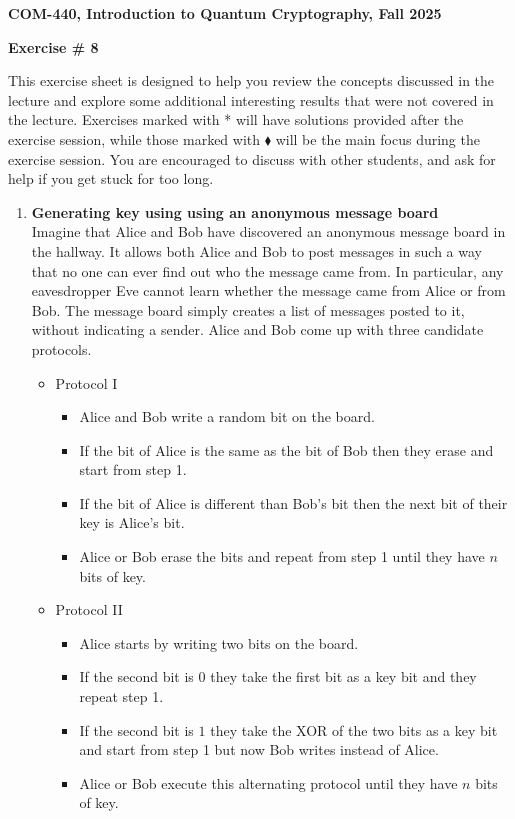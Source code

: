 \documentclass[12pt]{article}
\newcommand{\header}[1]{\begin{center} {\large\bf #1} \end{center}}
\begin{document}
\header{COM-440, Introduction to Quantum Cryptography, Fall 2025}
\header{\bf Exercise \# 8}

This exercise sheet is designed to help you review the concepts discussed in the lecture and explore some additional interesting results that were not covered in the lecture. Exercises marked with * will have solutions provided after the exercise session, while those marked with $\blacklozenge$ will be the main focus during the exercise session. You are encouraged to discuss with other students, and ask for help if you get stuck for too long.

\begin{enumerate}


\item {\bf Generating key using using an anonymous message board}\\
Imagine that Alice and Bob have discovered an anonymous message board in the hallway. It allows both Alice and Bob to post messages in such a way that no one can ever find out who the message came from. In particular, any eavesdropper Eve cannot learn whether the message came from Alice or from Bob. The message board simply creates a list of messages posted to it, without indicating a sender. Alice and Bob come up with three candidate protocols.
\begin{itemize}
\item Protocol I
\begin{itemize}
\item Alice and Bob write a random bit on the board.
\item If the bit of Alice is the same as the bit of Bob then they erase and start from step 1.
\item If the bit of Alice is different than Bob's bit then the next bit of their key is Alice's bit.
\item Alice or Bob erase the bits and repeat from step 1 until they have $n$ bits of key.
\end{itemize}
\item Protocol II
\begin{itemize}
\item Alice starts by writing two bits on the board.
\item If the second bit is $0$ they take the first bit as a key bit and they repeat step 1.
\item If the second bit is $1$ they take the XOR of the two bits as a key bit and start from step 1 but now Bob writes instead of Alice.
\item Alice or Bob execute this alternating protocol until they have $n$ bits of key.

\end{itemize}
\end{itemize}
\end{enumerate}
\end{document}
